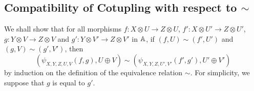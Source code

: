\subsection{Compatibility of Cotupling with respect to $\sim$}

We shall show that for all morphisms $f \colon X \otimes U \to Z \otimes U$,
$f' \colon X \otimes U' \to Z \otimes U'$,
$g \colon Y \otimes V \to Z \otimes V$ and
$g' \colon Y \otimes V' \to Z \otimes V'$ in $\mathbb{A}$, if
$(f,U) \sim (f',U')$ and $(g,V) \sim (g',V')$, then
\begin{equation*}
  (\psi_{X,Y,Z,U,V}(f,g),U \oplus V)
  \sim
  (\psi_{X,Y,Z,U',V'}(f',g'),U' \oplus V')
\end{equation*}
by induction on the definition of the equivalence relation $\sim$.
For simplicity, we suppose that $g$ is equal to $g'$.

